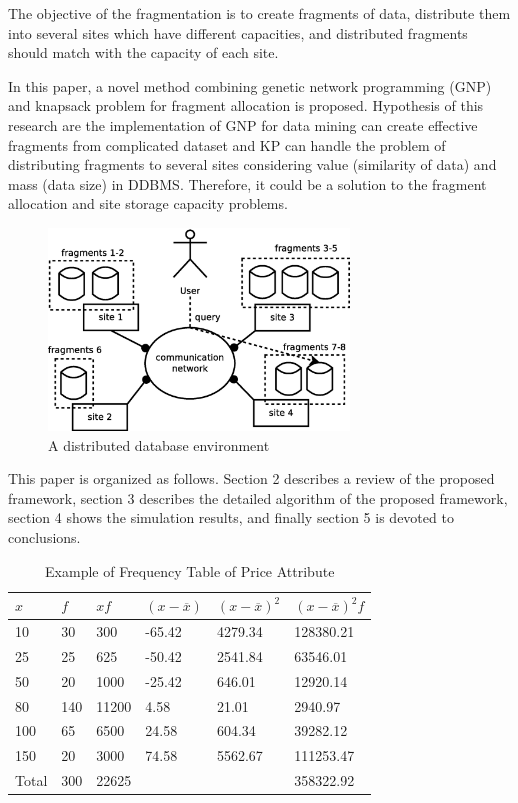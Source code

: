 \documentclass[fleqn,10pt,twocolumn]{SICE14}
\begin{document}
The objective of the fragmentation is to create fragments of data, distribute them into several sites which have different capacities, and distributed fragments should match with the capacity of each site.

In this paper, a novel method combining genetic network programming (GNP) and knapsack problem for fragment allocation is proposed. Hypothesis of this research are the implementation of GNP for data mining can create effective fragments from complicated dataset and KP can handle the problem of distributing fragments to several sites considering value (similarity of data) and mass (data size) in DDBMS. Therefore, it could be a solution to the fragment allocation and site storage capacity problems.

\begin{figure}[tb]
\begin{center}
\includegraphics[width=8cm]{ddbms}
\caption{\label{ddbms} A distributed database environment}
\end{center}
\end{figure}

This paper is organized as follows. Section 2 describes a review of the proposed framework, section 3 describes the detailed algorithm of the proposed framework, section 4 shows the simulation results, and finally section 5 is devoted to conclusions.

\begin{table}[tb]
\caption{\label{frequency-table}Example of Frequency Table of Price Attribute}
\begin{tabular}{|l|l|l|l|l|l|}
\hline 
$x$ & $f$ & $xf$ & $(x-\overline{x})$ & $(x-\overline{x})^{2}$ & $(x-\overline{x})^{2}f$\tabularnewline
\hline 
10 & 30 & 300 & -65.42 & 4279.34 & 128380.21\tabularnewline
\hline 
25 & 25 & 625 & -50.42 & 2541.84 & 63546.01\tabularnewline
\hline 
50 & 20 & 1000 & -25.42 & 646.01 & 12920.14\tabularnewline
\hline 
80 & 140 & 11200 & 4.58 & 21.01 & 2940.97\tabularnewline
\hline 
100 & 65 & 6500 & 24.58 & 604.34 & 39282.12\tabularnewline
\hline 
150 & 20 & 3000 & 74.58 & 5562.67 & 111253.47\tabularnewline
\hline 
Total & 300 & 22625 &  &  & 358322.92\tabularnewline
\hline 
\end{tabular}
\end{table}
\end{document}
